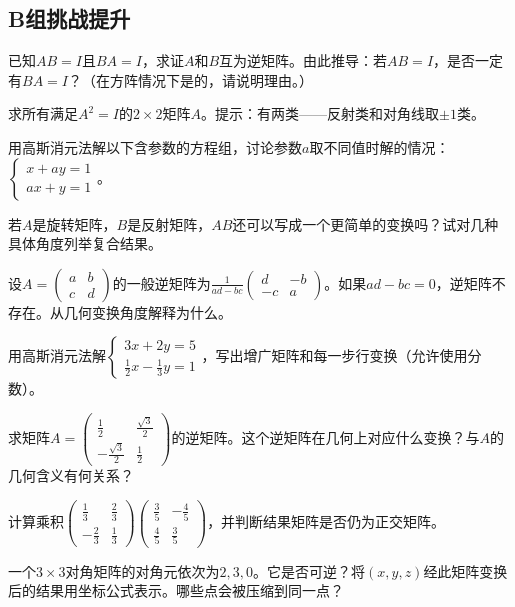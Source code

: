 \subsection*{B组\quad 挑战提升}

\begin{exercise}
\item 已知$AB=I$且$BA=I$，求证$A$和$B$互为逆矩阵。由此推导：若$AB=I$，是否一定有$BA=I$？（在方阵情况下是的，请说明理由。）
\item 求所有满足$A^2=I$的$2\times2$矩阵$A$。提示：有两类——反射类和对角线取$\pm1$类。
\item 用高斯消元法解以下含参数的方程组，讨论参数$a$取不同值时解的情况：$\begin{cases}x+ay=1\\ax+y=1\end{cases}$。
\item 若$A$是旋转矩阵，$B$是反射矩阵，$AB$还可以写成一个更简单的变换吗？试对几种具体角度列举复合结果。
\item 设$A=\begin{pmatrix}a&b\\c&d\end{pmatrix}$的一般逆矩阵为$\frac{1}{ad-bc}\begin{pmatrix}d&-b\\-c&a\end{pmatrix}$。如果$ad-bc=0$，逆矩阵不存在。从几何变换角度解释为什么。
\item 用高斯消元法解$\begin{cases}3x+2y=5\\\frac12 x-\frac13 y = 1\end{cases}$，写出增广矩阵和每一步行变换（允许使用分数）。
\item 求矩阵$A=\begin{pmatrix}\frac12&\frac{\sqrt3}{2}\\-\frac{\sqrt3}{2}&\frac12\end{pmatrix}$的逆矩阵。这个逆矩阵在几何上对应什么变换？与$A$的几何含义有何关系？
\item 计算乘积$\begin{pmatrix}\frac13&\frac23\\-\frac23&\frac13\end{pmatrix}\begin{pmatrix}\frac35&-\frac45\\\frac45&\frac35\end{pmatrix}$，并判断结果矩阵是否仍为正交矩阵。
\item 一个$3\times3$对角矩阵的对角元依次为$2,3,0$。它是否可逆？将$(x,y,z)$经此矩阵变换后的结果用坐标公式表示。哪些点会被压缩到同一点？
\end{exercise}

\newpage
